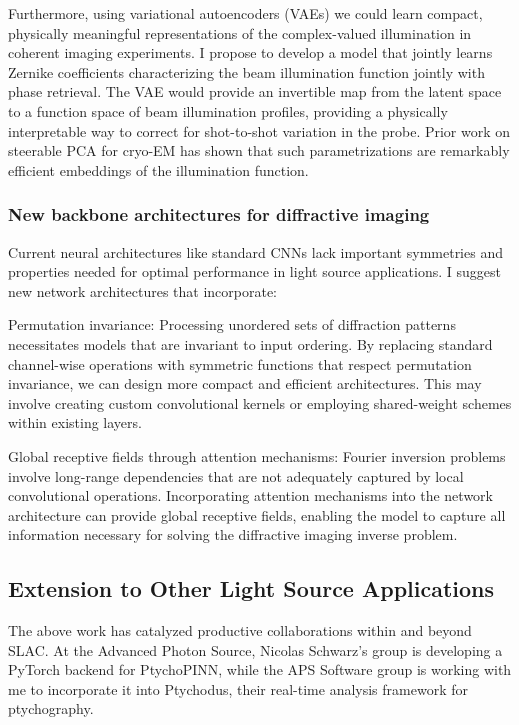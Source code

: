 \documentclass{article}
\begin{document}
Furthermore, using variational autoencoders (VAEs) we could learn compact, physically meaningful representations of the complex-valued illumination in coherent imaging experiments. I propose to develop a model that jointly learns Zernike coefficients characterizing the beam illumination function jointly with phase retrieval. The VAE would provide an invertible map from the latent space to a function space of beam illumination profiles, providing a physically interpretable way to correct for shot-to-shot variation in the probe. Prior work on steerable PCA for cryo-EM has shown that such parametrizations are remarkably efficient embeddings of the illumination function. \cite{zhao2016fast}

\subsubsection{New backbone architectures for diffractive imaging}
Current neural architectures like standard CNNs lack important symmetries and properties needed for optimal performance in light source applications. I suggest new network architectures that incorporate:

Permutation invariance: Processing unordered sets of diffraction patterns necessitates models that are invariant to input ordering. By replacing standard channel-wise operations with symmetric functions that respect permutation invariance, we can design more compact and efficient architectures. This may involve creating custom convolutional kernels or employing shared-weight schemes within existing layers.

Global receptive fields through attention mechanisms: Fourier inversion problems involve long-range dependencies that are not adequately captured by local convolutional operations. Incorporating attention mechanisms into the network architecture can provide global receptive fields, enabling the model to capture all information necessary for solving the diffractive imaging inverse problem.

\subsection{Extension to Other Light Source Applications}
The above work has catalyzed productive collaborations within and beyond SLAC. At the Advanced Photon Source, Nicolas Schwarz's group is developing a PyTorch backend for PtychoPINN, while the APS Software group is working with me to incorporate it into Ptychodus, their real-time analysis framework for ptychography.
\end{document}

